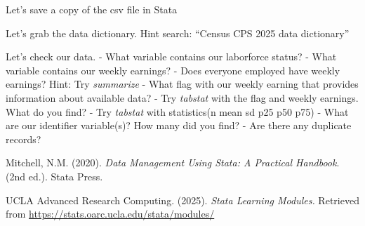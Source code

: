 \documentclass[
]{book}
\begin{document}
Let's save a copy of the csv file in Stata

Let's grab the data dictionary. Hint search: ``Census CPS 2025 data dictionary''

Let's check our data.
- What variable contains our laborforce status?
- What variable contains our weekly earnings?
- Does everyone employed have weekly earnings? Hint: Try \emph{summarize}
- What flag with our weekly earning that provides information about available data?
- Try \emph{tabstat} with the flag and weekly earnings. What do you find?
- Try \emph{tabstat} with statistics(n mean sd p25 p50 p75)
- What are our identifier variable(s)? How many did you find?
- Are there any duplicate records?

Mitchell, N.M. (2020). \emph{Data Management Using Stata: A Practical Handbook}. (2nd ed.). Stata Press.

UCLA Advanced Research Computing. (2025). \emph{Stata Learning Modules.} Retrieved from \url{https://stats.oarc.ucla.edu/stata/modules/}


\end{document}
